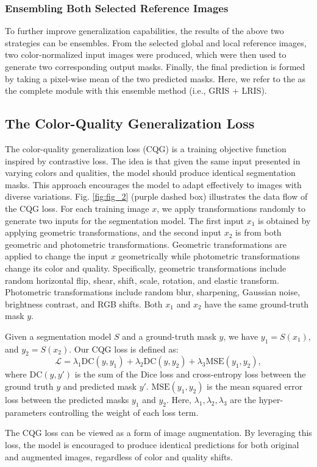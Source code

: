 \subsubsection{Ensembling Both Selected Reference Images}
To further improve generalization capabilities, the results of the above two strategies can be ensembles. 
From the selected global and local reference images, two color-normalized input images were produced, which were then used to generate two corresponding output masks. 
Finally, the final prediction is formed by taking a pixel-wise mean of the two predicted masks. 
Here, we refer to the  as the complete module with this ensemble method (i.e., GRIS + LRIS). 

\subsection{The Color-Quality Generalization Loss}
The color-quality generalization loss (CQG) is a training objective function inspired by contrastive loss. 
The idea is that given the same input presented in varying colors and qualities, the model should produce identical segmentation masks. 
This approach encourages the model to adapt effectively to images with diverse variations. 
Fig. \ref{fig:fig_2} (purple dashed box) illustrates the data flow of the CQG loss. 
For each training image $x$, we apply transformations randomly to generate two inputs for the segmentation model. 
The first input $x_1$ is obtained by applying geometric transformations, and the second input $x_2$ is from both geometric and photometric transformations. 
Geometric transformations are applied to change the input $x$ geometrically while photometric transformations change its color and quality. 
Specifically, geometric transformations include random horizontal flip, shear, shift, scale, rotation, and elastic transform. 
Photometric transformations include random blur, sharpening, Gaussian noise, brightness contrast, and RGB shifts. 
Both $x_1$ and $x_2$ have the same ground-truth mask $y$.

Given a segmentation model $S$ and a ground-truth mask $y$, we have $y_1 = S(x_1)$, and $y_2 = S(x_2)$. 
Our CQG loss is defined as:
\begin{equation}
    \mathcal{L} = \lambda_{1}\mathrm{DC}(y,y_1) + \lambda_{2}\mathrm{DC}(y,y_2) + \lambda_{3}\mathrm{MSE}(y_1,y_2),
\end{equation}
where $\mathrm{DC}(y,y\prime)$ is the sum of the Dice loss and cross-entropy loss between the ground truth $y$ and predicted mask $y\prime$. 
$\mathrm{MSE}(y_1,y_2)$ is the mean squared error loss between the predicted masks $y_1$ and $y_2$. 
Here, $\lambda_{1}, \lambda_{2}, \lambda_{3}$ are the hyper-parameters controlling the weight of each loss term. 

The CQG loss can be viewed as a form of image augmentation. By leveraging this loss, the model is encouraged to produce identical predictions for both original and augmented images, regardless of color and quality shifts. 